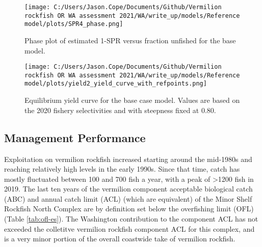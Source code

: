 \documentclass[11pt,
  english,
  a4paper,
]{article}
\begin{document}
\leavevmode\tagmcend\tagstructend\par


\begin{figure}
\centering
\texttt{[image: C:/Users/Jason.Cope/Documents/Github/Vermilion rockfish OR WA assessment 2021/WA/write\_up/models/Reference model/plots/SPR4\_phase.png]}
\caption{Phase plot of estimated 1-SPR versus fraction unfished for the base model.\label{fig:es-phase}}
\end{figure}

\tagmcend\tagstructend


\begin{figure}
\centering
\texttt{[image: C:/Users/Jason.Cope/Documents/Github/Vermilion rockfish OR WA assessment 2021/WA/write\_up/models/Reference model/plots/yield2\_yield\_curve\_with\_refpoints.png]}
\caption{Equilibrium yield curve for the base case model. Values are based on the 2020 fishery selectivities and with steepness fixed at 0.80.\label{fig:es-yield}}
\end{figure}

\tagmcend\tagstructend



\clearpage


\hypertarget{management-performance}{%
\subsection*{Management Performance}\label{management-performance}}

\leavevmode\tagmcend\tagstructend


Exploitation on vermilion rockfish increased starting around the mid-1980s and reaching relatively high levels in the early 1990s. Since that time, catch has mostly fluctuated between 100 and 700 fish a year, with a peak of \textgreater1200 fish in 2019. The last ten years of the vermilion component acceptable biological catch (ABC) and annual catch limit (ACL) (which are equivalent) of the Minor Shelf Rockfish North Complex are by definition set below the overfishing limit (OFL) (Table \ref{tab:ofl-es}). The Washington contribution to the component ACL has not exceeded the colletitve vermilion rockfish component ACL for this complex, and is a very minor portion of the overall coastwide take of vermilion rockfish.
\end{document}
